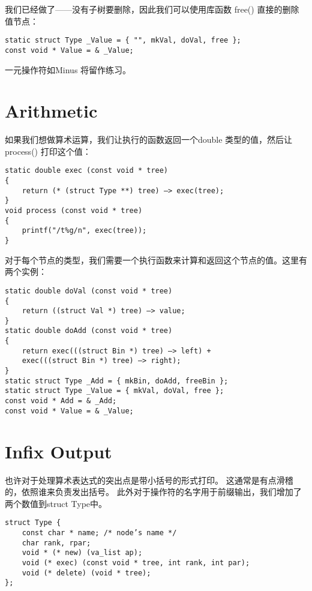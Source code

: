 我们已经做了——没有子树要删除，因此我们可以使用库函数 free() 直接的删除值节点：
\begin{lstlisting}
static struct Type _Value = { "", mkVal, doVal, free };
const void * Value = & _Value;
\end{lstlisting}

一元操作符如Minus 将留作练习。

\section{Arithmetic}
如果我们想做算术运算，我们让执行的函数返回一个double 类型的值，然后让process() 打印这个值：
\begin{lstlisting}
static double exec (const void * tree)
{
    return (* (struct Type **) tree) —> exec(tree);
}
void process (const void * tree)
{
    printf("/t%g/n", exec(tree));
}
\end{lstlisting}

对于每个节点的类型，我们需要一个执行函数来计算和返回这个节点的值。这里有两个实例：
\begin{lstlisting}
static double doVal (const void * tree)
{
    return ((struct Val *) tree) —> value;
}
static double doAdd (const void * tree)
{
    return exec(((struct Bin *) tree) —> left) +
    exec(((struct Bin *) tree) —> right);
}
static struct Type _Add = { mkBin, doAdd, freeBin };
static struct Type _Value = { mkVal, doVal, free };
const void * Add = & _Add;
const void * Value = & _Value;
\end{lstlisting}

\section{Infix Output}
也许对于处理算术表达式的突出点是带小括号的形式打印。
这通常是有点滑稽的，依照谁来负责发出括号。
此外对于操作符的名字用于前缀输出，我们增加了两个数值到struct Type中。
\begin{lstlisting}
struct Type {
    const char * name; /* node’s name */
    char rank, rpar;
    void * (* new) (va_list ap);
    void (* exec) (const void * tree, int rank, int par);
    void (* delete) (void * tree);
};
\end{lstlisting}

